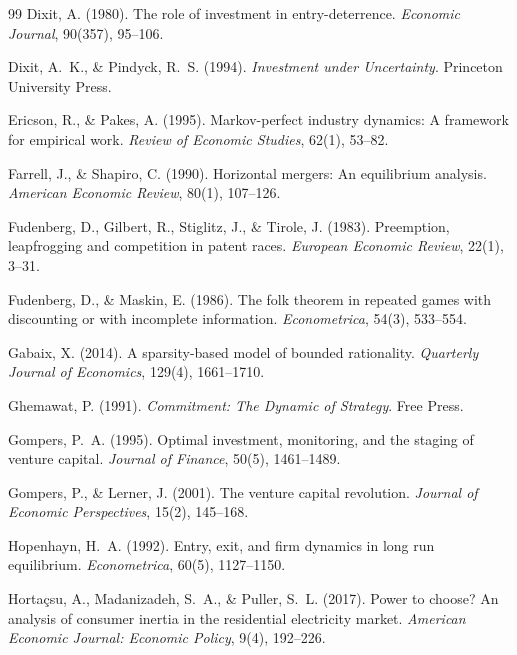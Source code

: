 \documentclass[11pt]{article}
\begin{document}
\begin{thebibliography}{99}
Dixit, A. (1980).
\newblock The role of investment in entry-deterrence.
\newblock \emph{Economic Journal}, 90(357), 95--106.

Dixit, A.~K., \& Pindyck, R.~S. (1994).
\newblock \emph{Investment under Uncertainty}.
\newblock Princeton University Press.

Ericson, R., \& Pakes, A. (1995).
\newblock Markov-perfect industry dynamics: A framework for empirical work.
\newblock \emph{Review of Economic Studies}, 62(1), 53--82.

Farrell, J., \& Shapiro, C. (1990).
\newblock Horizontal mergers: An equilibrium analysis.
\newblock \emph{American Economic Review}, 80(1), 107--126.

Fudenberg, D., Gilbert, R., Stiglitz, J., \& Tirole, J. (1983).
\newblock Preemption, leapfrogging and competition in patent races.
\newblock \emph{European Economic Review}, 22(1), 3--31.

Fudenberg, D., \& Maskin, E. (1986).
\newblock The folk theorem in repeated games with discounting or with incomplete information.
\newblock \emph{Econometrica}, 54(3), 533--554.

Gabaix, X. (2014).
\newblock A sparsity-based model of bounded rationality.
\newblock \emph{Quarterly Journal of Economics}, 129(4), 1661--1710.

Ghemawat, P. (1991).
\newblock \emph{Commitment: The Dynamic of Strategy}.
\newblock Free Press.

Gompers, P.~A. (1995).
\newblock Optimal investment, monitoring, and the staging of venture capital.
\newblock \emph{Journal of Finance}, 50(5), 1461--1489.

Gompers, P., \& Lerner, J. (2001).
\newblock The venture capital revolution.
\newblock \emph{Journal of Economic Perspectives}, 15(2), 145--168.

Hopenhayn, H.~A. (1992).
\newblock Entry, exit, and firm dynamics in long run equilibrium.
\newblock \emph{Econometrica}, 60(5), 1127--1150.

Horta\c{c}su, A., Madanizadeh, S.~A., \& Puller, S.~L. (2017).
\newblock Power to choose? An analysis of consumer inertia in the residential electricity market.
\newblock \emph{American Economic Journal: Economic Policy}, 9(4), 192--226.


\end{thebibliography}
\end{document}
